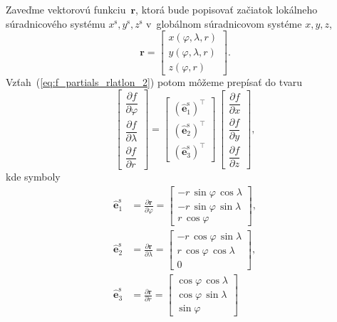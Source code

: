 \documentclass[a4paper, 12pt]{book}
\let\vec\mathbf
\begin{document}
Zaveďme vektorovú funkciu~$\vec r$, ktorá bude popisovať začiatok lokálneho 
súradnicového systému $x^\mathrm{s}, y^\mathrm{s}, z^\mathrm{s}$ v~globálnom 
súradnicovom systéme $x, y, z$,
%
\begin{equation}
\label{eq:vector_r}
\vec r =
%
\begin{bmatrix}
x(\varphi, \lambda, r)\\
y(\varphi, \lambda, r)\\
z(\varphi, r)
\end{bmatrix}
%
{.}
\end{equation}
%
Vzťah~(\ref{eq:f_partials_rlatlon_2}) potom môžeme prepísať do tvaru
%
\begin{equation}
\label{eq:grad_cart2sph}
\begin{bmatrix}
\dfrac{\partial f}{\partial \varphi}\\[2ex]
\dfrac{\partial f}{\partial \lambda}\\[2ex]
\dfrac{\partial f}{\partial r}
\end{bmatrix}
%
=
%
\begin{bmatrix}
\left( \hat{\vec e}_1^\mathrm{s} \right)^\top\\
\left( \hat{\vec e}_2^\mathrm{s} \right)^\top\\
\left( \hat{\vec e}_3^\mathrm{s} \right)^\top
\end{bmatrix}
%
\,
%
\begin{bmatrix}
\dfrac{\partial f}{\partial x}\\[2ex]
\dfrac{\partial f}{\partial y}\\[2ex]
\dfrac{\partial f}{\partial z}
\end{bmatrix}
%
{,}
\end{equation}
%
kde symboly
%
\begin{equation}
\label{eq:er_elat_elon}
\begin{split}
\hat{\vec e}_1^\mathrm{s} &= \frac{\partial \vec r}{\partial \varphi} = 
%
\begin{bmatrix}
-r \, \sin\varphi \, \cos\lambda\\
-r \, \sin\varphi \, \sin\lambda\\
r \, \cos\varphi
\end{bmatrix}
%
{,}\\
%
\hat{\vec e}_2^\mathrm{s} &= \frac{\partial \vec r}{\partial \lambda} = 
%
\begin{bmatrix}
-r \, \cos\varphi \, \sin\lambda\\
r \, \cos\varphi \, \cos\lambda\\
0
\end{bmatrix}
%
{,}\\
%
\hat{\vec e}_3^\mathrm{s} &= \frac{\partial \vec r}{\partial r} = 
%
\begin{bmatrix}
\cos\varphi \, \cos\lambda\\
\cos\varphi \, \sin\lambda\\
\sin\varphi
\end{bmatrix}
%
\end{split}
\end{equation}
\end{document}
